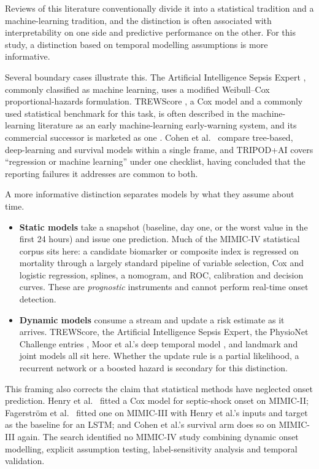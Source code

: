 Reviews of this literature conventionally divide it into a statistical
tradition and a machine-learning tradition, and the distinction is often
associated with interpretability on one side and predictive performance on the
other. For this study, a distinction based on temporal modelling assumptions
is more informative.

Several boundary cases illustrate this. The Artificial Intelligence Sepsis
Expert \cite{nemati2018aise}, commonly classified as machine learning, uses a
modified Weibull--Cox proportional-hazards formulation. TREWScore
\cite{henry2015trewscore}, a Cox model and a commonly used statistical
benchmark for this task, is often described in the machine-learning literature
as an early machine-learning early-warning system, and its commercial
successor is marketed as one \cite{adams2022trews}. Cohen et al.\
\cite{cohen2024subtle} compare tree-based, deep-learning and survival models
within a single frame, and TRIPOD+AI \cite{collins2024tripodai} covers
``regression or machine learning'' under one checklist, having concluded that
the reporting failures it addresses are common to both.

A more informative distinction separates models by what they assume about
time.

\begin{itemize}
    \item \textbf{Static models} take a snapshot (baseline, day one, or the
    worst value in the first 24 hours) and issue one prediction. Much of the
    MIMIC-IV statistical corpus sits here: a candidate biomarker or composite
    index is regressed on mortality through a largely standard pipeline of
    variable selection, Cox and logistic regression, splines, a nomogram, and
    ROC, calibration and decision curves. These are \emph{prognostic}
    instruments and cannot perform real-time onset detection.
    \item \textbf{Dynamic models} consume a stream and update a risk estimate as
    it arrives. TREWScore, the Artificial Intelligence Sepsis Expert, the
    PhysioNet Challenge entries \cite{reyna2020utility}, Moor et al.'s deep
    temporal model \cite{moor2023review}, and landmark and joint models all sit
    here. Whether the update rule is a partial likelihood, a recurrent network
    or a boosted hazard is secondary for this distinction.
\end{itemize}

This framing also corrects the claim that statistical methods have neglected
onset prediction. Henry et al.\ \cite{henry2015trewscore} fitted a Cox model
for septic-shock onset on MIMIC-II; Fagerstr{\"o}m et al.\
\cite{fagerstrom2019lisep} fitted one on MIMIC-III with Henry et al.'s inputs
and target as the baseline for an LSTM; and Cohen et al.'s survival arm does so
on MIMIC-III again. The search identified no MIMIC-IV study combining dynamic
onset modelling, explicit assumption testing, label-sensitivity analysis and
temporal validation.

